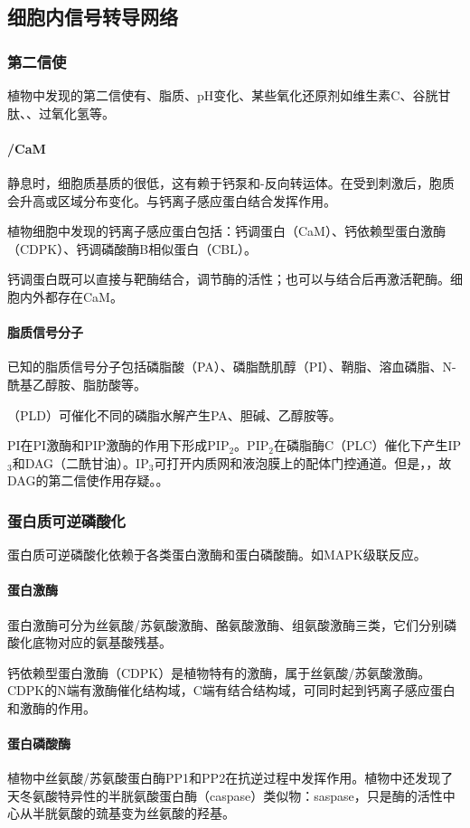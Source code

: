 \subsection{细胞内信号转导网络}

\subsubsection{第二信使}

植物中发现的第二信使有、脂质、pH变化、某些氧化还原剂如维生素C、谷胱甘肽、、过氧化氢等。

\paragraph{/CaM}

静息时，细胞质基质的很低，这有赖于钙泵和-反向转运体。在受到刺激后，胞质会升高或区域分布变化。与钙离子感应蛋白结合发挥作用。

植物细胞中发现的钙离子感应蛋白包括：钙调蛋白（CaM）、钙依赖型蛋白激酶（CDPK）、钙调磷酸酶B相似蛋白（CBL）。

钙调蛋白既可以直接与靶酶结合，调节酶的活性；也可以与结合后再激活靶酶。细胞内外都存在CaM。

\paragraph{脂质信号分子}

已知的脂质信号分子包括磷脂酸（PA）、磷脂酰肌醇（PI）、鞘脂、溶血磷脂、N-酰基乙醇胺、脂肪酸等。

（PLD）可催化不同的磷脂水解产生PA、胆碱、乙醇胺等。

PI在PI激酶和PIP激酶的作用下形成PIP$_{2}$。PIP$_{2}$在磷脂酶C（PLC）催化下产生IP$_{3}$和DAG（二酰甘油）。IP$_{3}$可打开内质网和液泡膜上的配体门控通道。但是，，故DAG的第二信使作用存疑。。

\subsubsection{蛋白质可逆磷酸化}

蛋白质可逆磷酸化依赖于各类蛋白激酶和蛋白磷酸酶。如MAPK级联反应。

\paragraph{蛋白激酶}

蛋白激酶可分为丝氨酸/苏氨酸激酶、酪氨酸激酶、组氨酸激酶三类，它们分别磷酸化底物对应的氨基酸残基。

钙依赖型蛋白激酶（CDPK）是植物特有的激酶，属于丝氨酸/苏氨酸激酶。CDPK的N端有激酶催化结构域，C端有结合结构域，可同时起到钙离子感应蛋白和激酶的作用。

\paragraph{蛋白磷酸酶}

植物中丝氨酸/苏氨酸蛋白酶PP1和PP2在抗逆过程中发挥作用。植物中还发现了天冬氨酸特异性的半胱氨酸蛋白酶（caspase）类似物：saspase，只是酶的活性中心从半胱氨酸的巯基变为丝氨酸的羟基。



